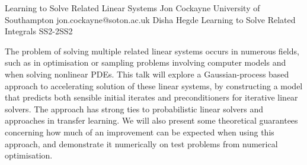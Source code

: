 \begin{talk}
  {Learning to Solve Related Linear Systems}%
  {Jon Cockayne}%
  {University of Southampton}%
  {jon.cockayne@soton.ac.uk}%
  {Disha Hegde}%
{Learning to Solve Related Integrals}
{}{SS2-2}{SS2}

			
The problem of solving multiple related linear systems occurs in numerous fields, such as in optimisation or sampling problems involving computer models and when solving nonlinear PDEs. This talk will explore a Gaussian-process based approach to accelerating solution of these linear systems, by constructing a model that predicts both sensible initial iterates and preconditioners for iterative linear solvers. The approach has strong ties to probabilistic linear solvers and approaches in transfer learning. We will also present some theoretical guarantees concerning how much of an improvement can be expected when using this approach, and demonstrate it numerically on test problems from numerical optimisation.

\end{talk}

